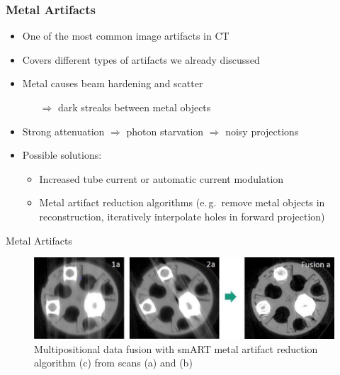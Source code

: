 \begin{frame}
	\frametitle{Metal Artifacts}


	\begin{itemize}
		\setlength\itemsep{0.3cm}
		\item One of the most common image artifacts in CT
		\item Covers different types of artifacts we already discussed
		\item Metal causes beam hardening and scatter
		      \begin{itemize}
			      \item[$\Rightarrow$] dark streaks between metal objects
		      \end{itemize}
		\item Strong attenuation $\Rightarrow$ photon starvation $\Rightarrow$ noisy projections

		\item Possible solutions:
		      \begin{itemize}
			      \item Increased tube current or automatic current modulation
			      \item Metal artifact reduction algorithms (e.\,g.~remove metal objects in reconstruction, iteratively interpolate holes in forward projection)
		      \end{itemize}

	\end{itemize}
\end{frame}

\begin{frame}[c]{Metal Artifacts}
	\begin{figure}[tbp]
		\centering
		\includegraphics[height=0.5\textheight]{images/herl_metal_artifacts.jpg}
		\caption{Multipositional data fusion with smART metal artifact reduction algorithm (c) from scans (a) and (b)}%
		\label{fig:metal_arifatc_reduction}
	\end{figure}

	\flushright{}
	\tiny

\end{frame}

